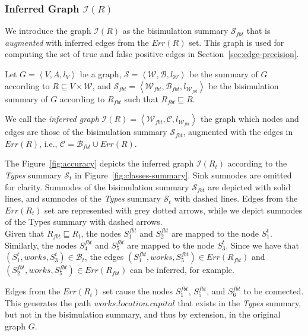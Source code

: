 \subsubsection{Inferred Graph $\mathcal{I}(R)$}

We introduce the graph $\mathcal{I}(R)$ as the bisimulation summary $\mathcal{S}_{fbt}$ that is \emph{augmented} with inferred edges from the $Err(R)$ set. This graph is used for computing the set of true and false positive edges in Section~\ref{sec:edge-precision}.

\begin{definition}
Let $G=\left\langle V, A, l_V \right\rangle$ be a graph, $\mathcal{S} = \left\langle \mathcal{W}, \mathcal{B}, l_{\mathcal{W}} \right\rangle$ be the summary of $G$ according to $R \subseteq V \times \mathcal{W}$, and $\mathcal{S}_{fbt} = \left\langle \mathcal{W}_{fbt}, \mathcal{B}_{fbt}, l_{\mathcal{W}_{fbt}} \right\rangle$ be the bisimulation summary of $G$ according to $R_{fbt}$ such that $R_{fbt} \sqsubseteq R$.

We call the \emph{inferred graph} $\mathcal{I}(R) = \left\langle \mathcal{W}_{fbt}, \mathcal{C}, l_{\mathcal{W}_{fbt}} \right\rangle$ the graph which nodes and edges are those of the bisimulation summary $\mathcal{S}_{fbt}$, augmented with the edges in $Err(R)$, i.e., $\mathcal{C} = \mathcal{B}_{fbt} \cup Err(R)$.
\end{definition}

The Figure~\ref{fig:accuracy} depicts the inferred graph $\mathcal{I}(R_t)$ according to the \emph{Types} summary $\mathcal{S}_t$ in Figure~\ref{fig:classes-summary}.
Sink sumnodes are omitted for clarity. Sumnodes of the bisimulation summary $\mathcal{S}_{fbt}$ are depicted with solid lines, and sumnodes of the \emph{Types} summary $\mathcal{S}_t$ with dashed lines. Edges from the $Err(R_t)$ set are represented with grey dotted arrows, while we depict sumnodes of the Types summary with dashed arrows.\\

Given that $R_{fbt} \sqsubseteq R_t$, the nodes $S^{fbt}_1$ and $S^{fbt}_2$ are mapped to the node $S^t_1$. Similarly, the nodes $S^{fbt}_4$ and $S^{fbt}_5$ are mapped to the node $S^t_3$. Since we have that $(S^t_1, works, S^t_3) \in \mathcal{B}_t$, the edges $(S^{fbt}_1, works, S^{fbt}_5) \in Err(R_{fbt})$ and $(S^{fbt}_2, works, S^{fbt}_5) \in Err(R_{fbt})$ can be inferred, for example.

Edges from the $Err(R_t)$ set cause the nodes $S^{fbt}_1$, $S^{fbt}_5$, and $S^{fbt}_6$ to be connected. This generates the path $works.location.capital$ that exists in the \emph{Types} summary, but not in the bisimulation summary, and thus by extension, in the original graph $G$.

